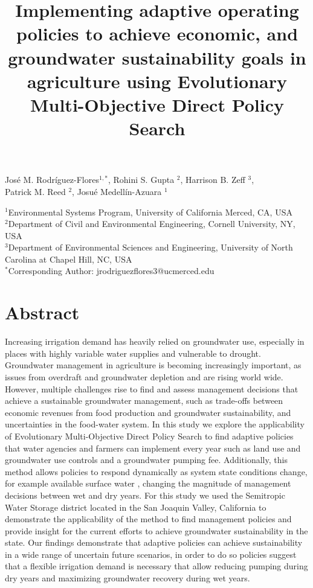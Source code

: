 \documentclass[11pt,a4paper]{article}
\title{Implementing adaptive operating policies to achieve economic, and groundwater sustainability goals in agriculture using Evolutionary Multi-Objective Direct Policy Search}
\date{}
\begin{document}
\maketitle

\vspace{-3cm}

\begin{center}
José M. Rodríguez-Flores$^{1,*}$, Rohini S. Gupta $^2$, Harrison B. Zeff $^3$,\\ Patrick M. Reed $^2$, Josué Medellín-Azuara $^1$\\
\end{center}

\begin{center}
\small
$^1$Environmental Systems Program, University of California Merced, CA, USA\\
$^2$Department of Civil and Environmental Engineering, Cornell University, NY, USA\\
$^3$Department of Environmental Sciences and Engineering, University of North Carolina at Chapel Hill, NC, USA\\
$^*$Corresponding Author: jrodriguezflores3@ucmerced.edu
\end{center}


\section*{Abstract}

Increasing irrigation demand has heavily relied on groundwater use, especially in places with highly variable water supplies and vulnerable to drought. Groundwater management in agriculture is becoming increasingly important, as issues from overdraft and groundwater depletion and are rising world wide. However, multiple challenges rise to find and assess management decisions that achieve a sustainable groundwater management, such as trade-offs between economic revenues from food production and groundwater sustainability, and uncertainties in the food-water system. In this study we explore the applicability of Evolutionary Multi-Objective Direct Policy Search to find adaptive policies that water agencies and farmers can implement every year such as land use and groundwater use controls and a groundwater pumping fee. Additionally, this method allows policies to respond dynamically as system state conditions change, for example available surface water , changing the magnitude of management decisions between wet and dry years. For this study we used the Semitropic Water Storage district located in the San Joaquin Valley, California to demonstrate the applicability of the method to find management policies and provide insight for the current efforts to achieve groundwater sustainability in the state. Our findings demonstrate that adaptive policies can achieve sustainability in a wide range of uncertain future scenarios, in order to do so policies suggest that a flexible irrigation demand is necessary that allow reducing pumping during dry years and maximizing groundwater recovery during wet years.  
 
\end{document}
